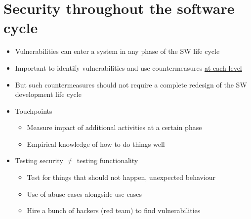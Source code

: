 \documentclass[12pt,titlepage,a4paper]{report}
\begin{document}
		\section{Security throughout the software cycle}
			\begin{itemize}
				\item Vulnerabilities can enter a system in any phase of the SW life cycle
				\item Important to identify vulnerabilities and use countermeasures \underline{at each level}
				\item But such countermeasures should not require a complete redesign of the SW development life cycle
				\item Touchpoints
				\begin{itemize}
					\item Measure impact of additional activities at a certain phase
					\item Empirical knowledge of how to do things well
				\end{itemize}
				\item Testing security $\neq$ testing functionality
				\begin{itemize}
					\item Test for things that should not happen, unexpected behaviour
					\item Use of abuse cases alongside use cases
					\item Hire a bunch of hackers (red team) to find vulnerabilities
				\end{itemize}
			\end{itemize}
\end{document}
